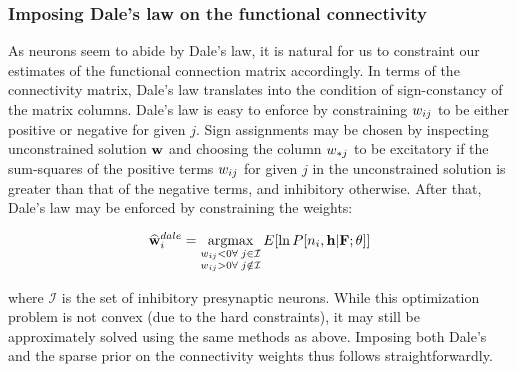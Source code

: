 \subsubsection{Imposing Dale's law on the functional connectivity}

As neurons seem to abide by Dale's law, it is natural for us to constraint our estimates of the functional connection matrix accordingly. In terms of the connectivity matrix, Dale's law translates into the condition of sign-constancy of the matrix columns. Dale's law is easy to enforce by constraining $w_{ij}$ to be either positive or negative for given $j$.  Sign assignments may be chosen by inspecting unconstrained solution $\mathbf{w}$ and choosing the column $w_{\ast j}$ to be excitatory if the sum-squares of the positive terms $w_{ij}$ for given $j$ in the unconstrained solution is greater than that of the negative terms, and inhibitory otherwise.  After that, Dale's law may be enforced by constraining the weights:


\begin{align}
	\widehat{\mathbf{w}}_i^{dale} = \operatorname*{argmax}_{\substack{w_{ij}<0 \forall \; j \in \mathcal{I} \\ w_{ij}>0 \forall \; j \notin \mathcal{I} }}   E[\ln P[n_i, \mathbf{h} |{\bf F}; \mathbf{\theta}]]
\end{align}


\noindent where $\mathcal{I}$ is the set of inhibitory presynaptic neurons.  While this optimization problem is not convex (due to the hard constraints), it may still be approximately solved using the same methods as above.  Imposing both Dale's and the sparse prior on the connectivity weights thus follows straightforwardly.  

